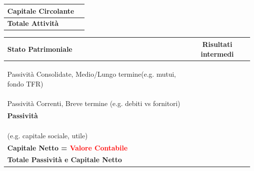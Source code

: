 \documentclass[a4paper,10pt]{article}
\begin{document}
\begin{table}[H]
{\begin{tabular}{|l|c|}
            \hline
            \textbf{Capitale Circolante}                                  &                     \\
            \hline
            \hline
            \textbf{Totale Attività}                                      &                     \\
            \hline
        \end{tabular}
        \begin{tabular}{|l|c|}
            \hline
            \rowcolor{myblue} \color{white} \textbf{Stato Patrimoniale}  &\color{white}  Risultati intermedi \\
            \hline
                                                                                      &                     \\
                                                                                      &                     \\
                                                                                      &                     \\
            Passività Consolidate, Medio/Lungo termine(e.g. mutui, fondo TFR)                                &                     \\
            \hline
                                                                                      &                     \\
                                                                                      &                     \\
                                                                                      &                     \\
            Passività Correnti, Breve termine (e.g. debiti vs fornitori)                                        &                     \\
            \hline
            \textbf{Passività}                                                        &                     \\
            \hline
            \hline
                                                                                      &                     \\
                                                                                      &                     \\
                                                                                      &                     \\
            (e.g. capitale sociale, utile)                                            &                     \\
            \hline
            \textbf{Capitale Netto = \textcolor{red}{ Valore Contabile}}               &                     \\
            \hline
            \hline
            \textbf{Totale Passività e Capitale Netto}                                &                     \\
            \hline
        \end{tabular}
    }
\end{table}
\end{document}
